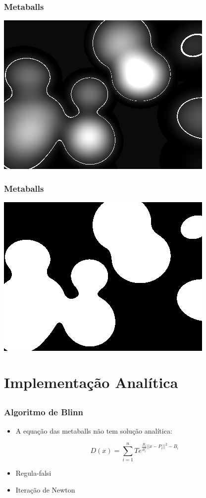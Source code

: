 \documentclass[brazil]{beamer}
\begin{document}
    \begin{frame}
      \frametitle{Metaballs}
        \begin{center}
          \includegraphics[width=.7\textwidth]{imgs/metaball-2d-2.png}
        \end{center}
    \end{frame}

    \begin{frame}
      \frametitle{Metaballs}
        \begin{center}
          \includegraphics[width=.7\textwidth]{imgs/metaball-2d-3.png}
        \end{center}
    \end{frame}


  \section*{Implementação Analítica}
    \subsection{}
    \begin{frame}
      \frametitle{Algoritmo de Blinn}
      \begin{itemize}
        \item A equação das metaballs não tem solução analítica:
          \vspace{0.5em}
          \begin{center}
            $$D(x) = \sum_{i = 1}^n Te^{\frac{B_i}{R_i^2}||x-P_i||^2-B_i} $$
          \end{center}
        \item Regula-falsi
        \item Iteração de Newton
      \end{itemize}
    \end{frame}
        
\end{document}
